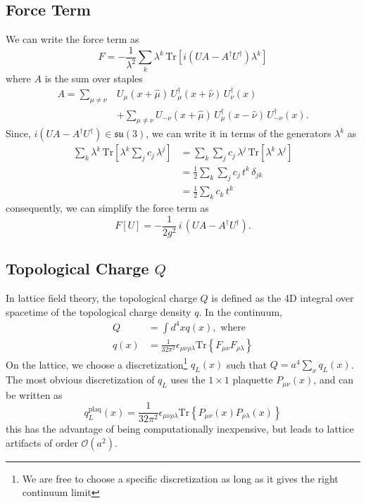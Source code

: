 \documentclass[a4paper,11pt]{article}
\begin{document}
\subsection{\label{subsec:force_term}Force Term}

We can write the force term as
%
\begin{equation}
    F = - \frac{1}{\lambda^{2}} \sum_{k} \lambda^{k} \, \mathrm{Tr}\left[ i \left(UA - A^{\dagger}U^{\dagger}\right) \lambda^{k} \right]
\end{equation}
%
where $A$ is the sum over staples
%
\begin{align}
A = \sum_{\mu\neq\nu}& U_{\mu}(x +\hat{\mu})\, U^{\dagger}_{\mu}(x + \hat{\nu}) \, U^{\dagger}_{\nu}(x) \\ 
&+ \sum_{\mu\neq\nu} U_{-\nu}(x + \hat{\mu})\, U^{\dagger}_{\mu}(x - \hat{\nu})\, U^{\dagger}_{-\nu}(x).
\end{align}
%
Since, $i\left(UA - A^{\dagger}U^{\dagger}\right) \in \mathfrak{su}(3)$,
we can write it in terms of the generators $\lambda^{k}$ as
%
\begin{align}
    \sum_{k} \lambda^{k} \,\mathrm{Tr}\left[ \lambda^{k} \sum_{j} c_{j}\, \lambda^{j}\right] &= \sum_{k}\sum_{j} c_{j}\, \lambda^{j} \,\mathrm{Tr}\left[ \lambda^{k} \, \lambda^{j}\right] \\
    &= \frac{1}{2}\sum_{k}\sum_{j} c_{j}\, t^{k}\, \delta_{jk} \\
    &= \frac{1}{2}\sum_{k} c_{k} \, t^{k}
\end{align}
%
consequently, we can simplify the force term as
%
\begin{equation}
    F[U] = - \frac{1}{2g^{2}}\, i \, \left(UA - A^{\dagger}U^{\dagger}\right).
\end{equation}
%

\subsection{\label{subsec:topological_charge}Topological Charge \texorpdfstring{$Q$}{Q}}
%
In lattice field theory, the topological charge $Q$ is defined as the 4D
integral over spacetime of the topological charge density $q$.
%
In the continuum,
%
\begin{align}
    Q &= \int d^{4}x q(x), \text{ where } \\
    q(x) &= \frac{1}{32\pi^{2}} \epsilon_{\mu\nu\rho\lambda} \mathrm{Tr}\left\{ F_{\mu\nu} F_{\rho\lambda} \right\}
\end{align}
%
On the lattice, we choose a discretization\footnote{We are free to choose a specific discretization as long as it gives the right continuum limit} $q_{L}(x)$ such that
$Q = a^{4} \sum_{x} q_{L}(x)$.
%
The most obvious discretization of $q_{L}$ uses the $1\times1$ plaquette
$P_{\mu\nu}(x)$, and can be written as
%
\begin{equation}
    q^{\mathrm{plaq}}_{L}(x) = \frac{1}{32\pi^{2}} \epsilon_{\mu\nu\rho\lambda} \mathrm{Tr}\left\{P_{\mu\nu}(x) P_{\rho\lambda}(x)\right\}
\end{equation}
%
this has the advantage of being computationally inexpensive, but leads
to lattice artifacts of order $\mathcal{O}(a^{2})$.
\end{document}
